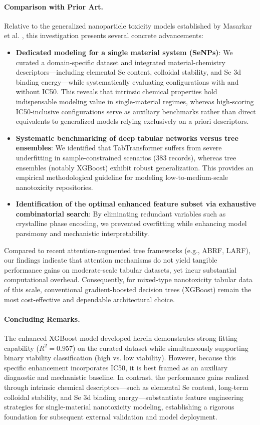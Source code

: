 \paragraph{Comparison with Prior Art.}
Relative to the generalized nanoparticle toxicity models established by Masarkar et al. \cite{masarkar2024}, this investigation presents several concrete advancements:
\begin{itemize}
  \item \textbf{Dedicated modeling for a single material system (SeNPs)}: We curated a domain-specific dataset and integrated material-chemistry descriptors—including elemental Se content, colloidal stability, and Se 3d binding energy—while systematically evaluating configurations with and without IC50. This reveals that intrinsic chemical properties hold indispensable modeling value in single-material regimes, whereas high-scoring IC50-inclusive configurations serve as auxiliary benchmarks rather than direct equivalents to generalized models relying exclusively on a priori descriptors.
  \item \textbf{Systematic benchmarking of deep tabular networks versus tree ensembles}: We identified that TabTransformer suffers from severe underfitting in sample-constrained scenarios (383 records), whereas tree ensembles (notably XGBoost) exhibit robust generalization. This provides an empirical methodological guideline for modeling low-to-medium-scale nanotoxicity repositories.
  \item \textbf{Identification of the optimal enhanced feature subset via exhaustive combinatorial search}: By eliminating redundant variables such as crystalline phase encoding, we prevented overfitting while enhancing model parsimony and mechanistic interpretability.
\end{itemize}
Compared to recent attention-augmented tree frameworks (e.g., ABRF, LARF), our findings indicate that attention mechanisms do not yield tangible performance gains on moderate-scale tabular datasets, yet incur substantial computational overhead. Consequently, for mixed-type nanotoxicity tabular data of this scale, conventional gradient-boosted decision trees (XGBoost) remain the most cost-effective and dependable architectural choice.

\paragraph{Concluding Remarks.}
The enhanced XGBoost model developed herein demonstrates strong fitting capability ($R^2 = 0.957$) on the curated dataset while simultaneously supporting binary viability classification (high vs. low viability). However, because this specific enhancement incorporates IC50, it is best framed as an auxiliary diagnostic and mechanistic baseline. In contrast, the performance gains realized through intrinsic chemical descriptors—such as elemental Se content, long-term colloidal stability, and Se 3d binding energy—substantiate feature engineering strategies for single-material nanotoxicity modeling, establishing a rigorous foundation for subsequent external validation and model deployment.
